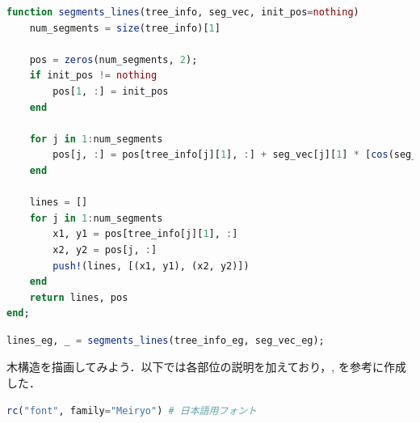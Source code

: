 \begin{lstlisting}[language=julia]
function segments_lines(tree_info, seg_vec, init_pos=nothing)
    num_segments = size(tree_info)[1]
    
    pos = zeros(num_segments, 2);
    if init_pos != nothing
        pos[1, :] = init_pos
    end
    
    for j in 1:num_segments
        pos[j, :] = pos[tree_info[j][1], :] + seg_vec[j][1] * [cos(seg_vec[j][2]), sin(seg_vec[j][2])]
    end
    
    lines = []
    for j in 1:num_segments
        x1, y1 = pos[tree_info[j][1], :]
        x2, y2 = pos[j, :]
        push!(lines, [(x1, y1), (x2, y2)])
    end
    return lines, pos
end;
\end{lstlisting}
\begin{lstlisting}[language=julia]
lines_eg, _ = segments_lines(tree_info_eg, seg_vec_eg);
\end{lstlisting}
木構造を描画してみよう．以下では各部位の説明を加えており，\citep{Koene2009-hv}, \citep{Cuntz2010-in}を参考に作成した．
\begin{lstlisting}[language=julia]
rc("font", family="Meiryo") # 日本語用フォント
\end{lstlisting}

